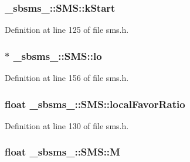 \subsubsection[{\texorpdfstring{k\+Start}{kStart}}]{ \+\_\+sbsms\+\_\+\+::\+S\+M\+S\+::k\+Start\hspace{0.3cm}{\ttfamily [protected]}}\hypertarget{class__sbsms___1_1_s_m_s_acd65f383388dd63abe5db92b159adac8}{}\label{class__sbsms___1_1_s_m_s_acd65f383388dd63abe5db92b159adac8}


Definition at line 125 of file sms.\+h.

\subsubsection[{\texorpdfstring{lo}{lo}}]{$\ast$ \+\_\+sbsms\+\_\+\+::\+S\+M\+S\+::lo\hspace{0.3cm}{\ttfamily [protected]}}\hypertarget{class__sbsms___1_1_s_m_s_a6353b7fc02d0ff088902dd20d8811de1}{}\label{class__sbsms___1_1_s_m_s_a6353b7fc02d0ff088902dd20d8811de1}


Definition at line 156 of file sms.\+h.

\subsubsection[{\texorpdfstring{local\+Favor\+Ratio}{localFavorRatio}}]{\setlength{\rightskip}{0pt plus 5cm}float \+\_\+sbsms\+\_\+\+::\+S\+M\+S\+::local\+Favor\+Ratio\hspace{0.3cm}{\ttfamily [protected]}}\hypertarget{class__sbsms___1_1_s_m_s_a3073f4d6568aee0c116315885057f1a0}{}\label{class__sbsms___1_1_s_m_s_a3073f4d6568aee0c116315885057f1a0}


Definition at line 130 of file sms.\+h.

\subsubsection[{\texorpdfstring{M}{M}}]{\setlength{\rightskip}{0pt plus 5cm}float \+\_\+sbsms\+\_\+\+::\+S\+M\+S\+::M\hspace{0.3cm}{\ttfamily [protected]}}\hypertarget{class__sbsms___1_1_s_m_s_ab04df9c211bc498c3f4c46daf3d237a8}{}\label{class__sbsms___1_1_s_m_s_ab04df9c211bc498c3f4c46daf3d237a8}


